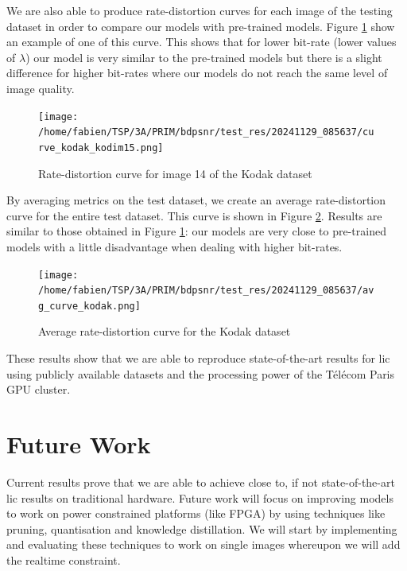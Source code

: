 We are also able to produce rate-distortion curves for each image of the testing dataset in order to compare our models with pre-trained models. Figure \ref{bdpsnr_3} show an example of one of this curve. This shows that for lower bit-rate (lower values of \(\lambda\)) our model is very similar to the pre-trained models but there is a slight difference for higher bit-rates where our models do not reach the same level of image quality.

\begin{figure}
    \centering
    \texttt{[image: /home/fabien/TSP/3A/PRIM/bdpsnr/test\_res/20241129\_085637/curve\_kodak\_kodim15.png]}
    \caption{Rate-distortion curve for image 14 of the Kodak dataset}
    \label{bdpsnr_3}
\end{figure}

By averaging metrics on the test dataset, we create an average rate-distortion curve for the entire test dataset. This curve is shown in Figure \ref{bdpsnr_4}. Results are similar to those obtained in Figure \ref{bdpsnr_3}: our models are very close to pre-trained models with a little disadvantage when dealing with higher bit-rates.

\begin{figure}
    \centering
    \texttt{[image: /home/fabien/TSP/3A/PRIM/bdpsnr/test\_res/20241129\_085637/avg\_curve\_kodak.png]}
    \caption{Average rate-distortion curve for the Kodak dataset}
    \label{bdpsnr_4}
\end{figure}

These results show that we are able to reproduce state-of-the-art results for \acrshort{lic} using publicly available datasets and the processing power of the Télécom Paris GPU cluster.

\section{Future Work}
Current results prove that we are able to achieve close to, if not state-of-the-art \acrshort{lic} results on traditional hardware. Future work will focus on improving models to work on power constrained platforms (like FPGA) by using techniques like pruning, quantisation and knowledge distillation. We will start by implementing and evaluating these techniques to work on single images whereupon we will add the realtime constraint.